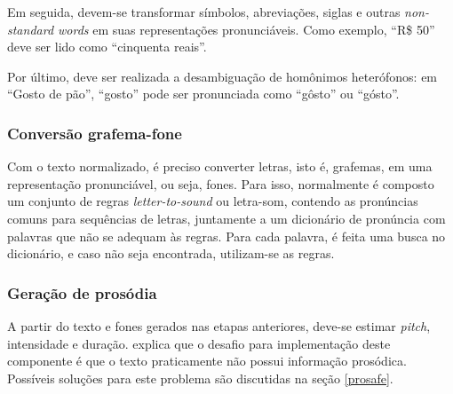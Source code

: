 Em seguida, devem-se transformar símbolos, abreviações, siglas e outras
\emph{non-standard words} em suas representações pronunciáveis. Como exemplo,
``R\$ 50'' deve ser lido como ``cinquenta reais''.

Por último, deve ser realizada a desambiguação de homônimos heterófonos: em
``Gosto de pão'', ``gosto'' pode ser pronunciada como ``gôsto'' ou ``gósto''.

\subsubsection{Conversão grafema-fone}
Com o texto normalizado, é preciso converter letras, isto é, grafemas, em uma
representação pronunciável, ou seja, fones. Para isso, normalmente é composto um
conjunto de regras \emph{letter-to-sound} ou letra-som, contendo as pronúncias
comuns para sequências de letras, juntamente a um dicionário de pronúncia com
palavras que não se adequam às regras. Para cada palavra, é feita uma busca no
dicionário, e caso não seja encontrada, utilizam-se as regras.

\subsubsection{Geração de prosódia}
\label{gerpros}
A partir do texto e fones gerados nas etapas anteriores, deve-se estimar
\emph{pitch}, intensidade e duração.  explica que o
desafio para implementação deste componente é que o texto praticamente não
possui informação prosódica. Possíveis soluções para este problema são
discutidas na seção \ref{prosafe}.

